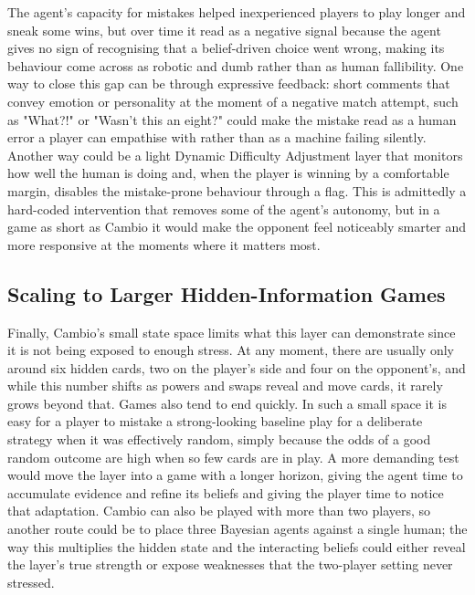 \documentclass[12pt,a4paper,oneside]{report}
\begin{document}
The agent's capacity for mistakes helped inexperienced players to play longer and sneak some wins, but over time it read as a negative signal because the agent gives no sign of recognising that a
belief-driven choice went wrong, making its behaviour come across as robotic and dumb rather than as
human fallibility. One way to close this gap can be through expressive feedback:
short comments that convey emotion or personality at the moment of a negative match attempt,
such as "What?!" or "Wasn't this an eight?" could make the mistake read as a human error
a player can empathise with rather than as a machine failing silently. Another way could be a
light Dynamic Difficulty Adjustment layer that monitors how well the human is doing and,
when the player is winning by a comfortable margin, disables the mistake-prone behaviour
through a flag. This is admittedly a hard-coded intervention that removes some of the
agent's autonomy, but in a game as short as Cambio it would make the opponent feel
noticeably smarter and more responsive at the moments where it matters most.

\subsection{Scaling to Larger Hidden-Information Games}

Finally, Cambio's small state space limits what this layer can demonstrate since it is not being exposed to enough stress. At any moment, there are usually only around six hidden cards, two on the player's side and four on the opponent's, and while this number shifts as powers and swaps reveal and move cards, it
rarely grows beyond that. Games also tend to end quickly. In such a small space it is easy
for a player to mistake a strong-looking baseline play for a deliberate strategy when it
was effectively random, simply because the odds of a good random outcome are high when so
few cards are in play. A more demanding test would move the layer into a game with a longer
horizon, giving the agent time to accumulate evidence and refine its beliefs and giving the
player time to notice that adaptation. Cambio can also be played with more than two players,
so another route could be to place three Bayesian agents against a single human; the way
this multiplies the hidden state and the interacting beliefs could either reveal the layer's
true strength or expose weaknesses that the two-player setting never stressed.


\printbibliography[heading=bibintoc]
\end{document}
